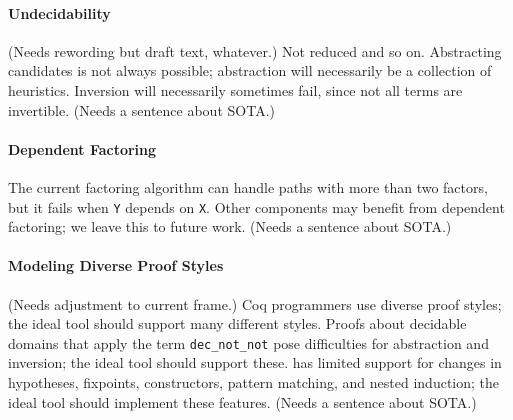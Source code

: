 \paragraph{Undecidability} (Needs rewording but draft text, whatever.)
Not reduced and so on.
Abstracting candidates is not always possible; abstraction will necessarily be a collection of heuristics.
Inversion will necessarily sometimes fail, since not all terms are invertible.
(Needs a sentence about SOTA.)

\paragraph{Dependent Factoring} The current factoring algorithm can handle paths
with more than two factors, but it fails when \lstinline{Y} depends on \lstinline{X}.
Other components may benefit from dependent factoring; we leave this to future work.
(Needs a sentence about SOTA.)

\paragraph{Modeling Diverse Proof Styles} (Needs adjustment to current frame.)
Coq programmers use diverse proof styles; the ideal tool should support many different styles.
Proofs about decidable domains that apply the term \lstinline{dec_not_not}
pose difficulties for abstraction and inversion; the ideal tool should support these. 
\sysname has limited support for changes in hypotheses, fixpoints, constructors, 
pattern matching, and nested induction; the ideal tool should implement these features.
(Needs a sentence about SOTA.)

